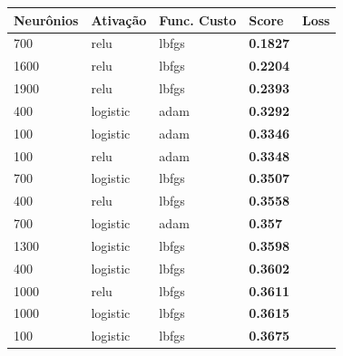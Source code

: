 \documentclass[conference]{IEEEtran}
\begin{document}
\begin{center}

    \begin{tabular}{| l | l | l | l | l |}
    \hline
    \textbf{Neurônios} & \textbf{Ativação} & \textbf{Func. Custo} & \textbf{Score} & \textbf{Loss} \\ \hline
700                     & relu                   & lbfgs                  & \textbf{0.1827}        &                 \\ \hline
1600                    & relu                   & lbfgs                  & \textbf{0.2204}        &                 \\ \hline
1900                    & relu                   & lbfgs                  & \textbf{0.2393}        &                 \\ \hline
400                     & logistic               & adam                   & \textbf{0.3292}        &                 \\ \hline
100                     & logistic               & adam                   & \textbf{0.3346}        &                 \\ \hline
100                     & relu                   & adam                   & \textbf{0.3348}        &                 \\ \hline
700                     & logistic               & lbfgs                  & \textbf{0.3507}        &                 \\ \hline
400                     & relu                   & lbfgs                  & \textbf{0.3558}        &                 \\ \hline
700                     & logistic               & adam                   & \textbf{0.357}           &                 \\ \hline
1300                    & logistic               & lbfgs                  & \textbf{0.3598}        &                 \\ \hline
400                     & logistic               & lbfgs                  & \textbf{0.3602}        &                 \\ \hline
1000                    & relu                   & lbfgs                  & \textbf{0.3611}        &                 \\ \hline
1000                    & logistic               & lbfgs                  & \textbf{0.3615}        &                 \\ \hline
100                     & logistic               & lbfgs                  & \textbf{0.3675}        &                 \\ \hline

\end{tabular}
\end{center}
\end{document}
